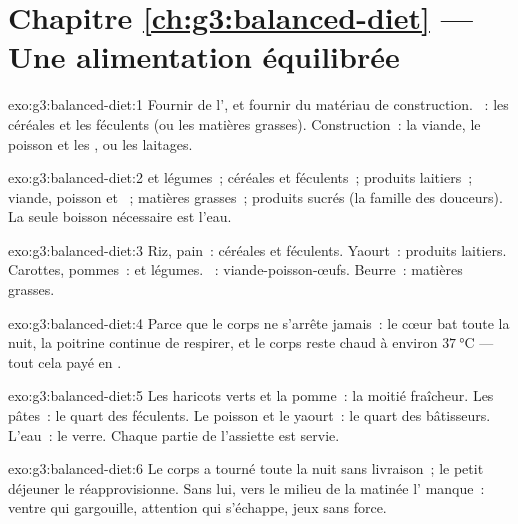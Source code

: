 \section*{Chapitre \ref{ch:g3:balanced-diet} --- Une alimentation équilibrée}

\begin{solution}{exo:g3:balanced-diet:1}
Fournir de l', et fournir du matériau de construction.
~: les céréales et les féculents (ou les matières grasses).
Construction~: la viande, le poisson et les , ou les laitages.
\end{solution}

\begin{solution}{exo:g3:balanced-diet:2}
 et légumes~; céréales et féculents~; produits laitiers~;
viande, poisson et ~; matières grasses~; produits sucrés (la
famille des douceurs). La seule boisson nécessaire est l'eau.
\end{solution}

\begin{solution}{exo:g3:balanced-diet:3}
Riz, pain~: céréales et féculents. Yaourt~: produits laitiers.
Carottes, pommes~:  et légumes. ~: viande-poisson-œufs.
Beurre~: matières grasses.
\end{solution}

\begin{solution}{exo:g3:balanced-diet:4}
Parce que le corps ne s'arrête jamais~: le cœur bat toute la nuit,
la poitrine continue de respirer, et le corps reste chaud à environ
$\qty{37}{\degreeCelsius}$ --- tout cela payé en .
\end{solution}

\begin{solution}{exo:g3:balanced-diet:5}
Les haricots verts et la pomme~: la moitié fraîcheur. Les pâtes~: le
quart des féculents. Le poisson et le yaourt~: le quart des
bâtisseurs. L'eau~: le verre. Chaque partie de l'assiette est
servie.
\end{solution}

\begin{solution}{exo:g3:balanced-diet:6}
Le corps a tourné toute la nuit sans livraison~; le petit déjeuner
le réapprovisionne. Sans lui, vers le milieu de la matinée
l' manque~: ventre qui gargouille, attention qui s'échappe,
jeux sans force.
\end{solution}

